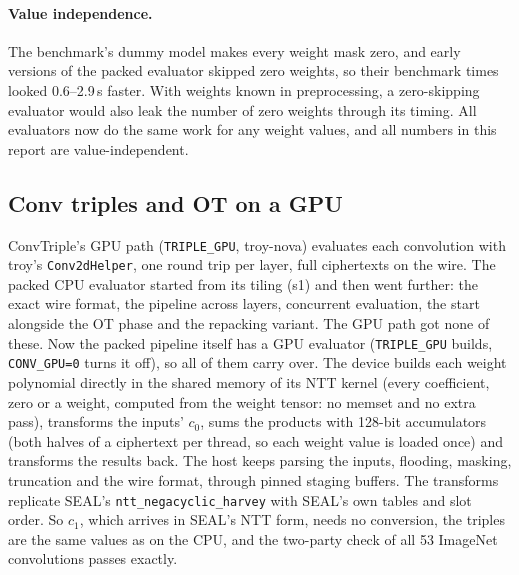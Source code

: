 \documentclass[10pt,a4paper]{article}
\newcommand{\s}{\,s\xspace}
\begin{document}
\paragraph{Value independence.}\label{sec:zero} The benchmark's dummy model makes every weight mask zero, and early
versions of the packed evaluator skipped zero weights, so their benchmark times looked 0.6--2.9\s
faster. With weights known in preprocessing, a zero-skipping evaluator would also leak the number of zero weights through its
timing. All evaluators now do the same work for any weight values, and all numbers in this report are value-independent.

\subsection{Conv triples and OT on a GPU}\label{sec:gpu}

ConvTriple's GPU path (\texttt{TRIPLE\_GPU}, troy-nova) evaluates each convolution with troy's \texttt{Conv2dHelper}, one
round trip per layer, full ciphertexts on the wire. The packed CPU evaluator started from its tiling (s1) and then went
further: the exact wire format, the pipeline across layers, concurrent evaluation, the start alongside the OT phase and the
repacking variant. The GPU path got none of these. Now the packed pipeline itself has a GPU evaluator (\texttt{TRIPLE\_GPU}
builds, \texttt{CONV\_GPU=0} turns it off), so all of them carry over. The device builds each weight polynomial directly in
the shared memory of its NTT kernel (every coefficient, zero or a weight, computed from the weight tensor: no memset and
no extra pass), transforms the inputs' $c_0$, sums the products with 128-bit accumulators (both halves of a ciphertext per
thread, so each weight value is loaded once) and transforms the results back. The host keeps parsing the inputs,
flooding, masking, truncation and the wire format, through pinned staging buffers. The transforms replicate SEAL's
\texttt{ntt\_negacyclic\_harvey} with SEAL's own tables and slot order. So $c_1$, which arrives in SEAL's NTT form, needs no
conversion, the triples are the same values as on the CPU, and the two-party check of all 53 ImageNet convolutions passes
exactly.
\end{document}
